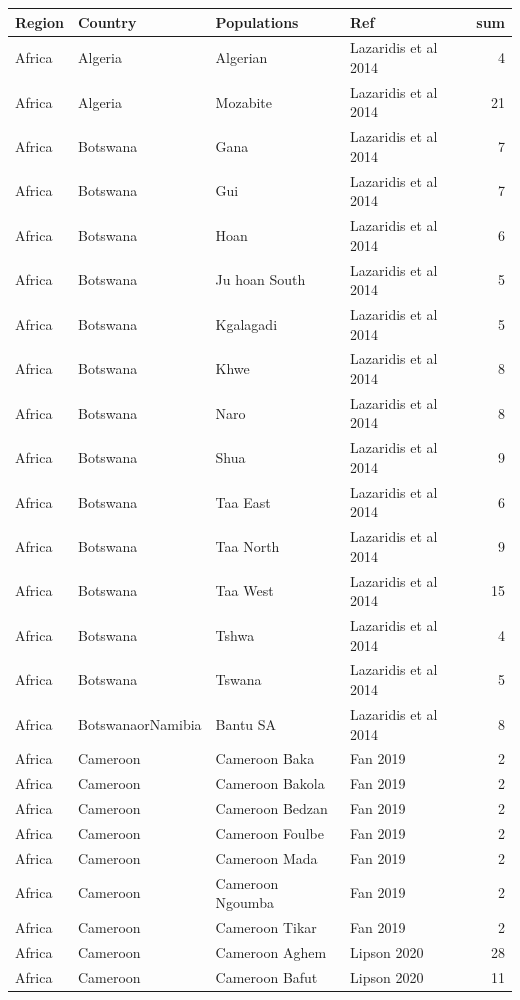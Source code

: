 \begin{longtable}[t]{lll>{\raggedright\arraybackslash}p{9em}r}
\toprule
Region & Country & Populations & Ref & sum\\
\midrule
Africa & Algeria & Algerian & Lazaridis et al 2014 & 4\\
Africa & Algeria & Mozabite & Lazaridis et al 2014 & 21\\
Africa & Botswana & Gana & Lazaridis et al 2014 & 7\\
Africa & Botswana & Gui & Lazaridis et al 2014 & 7\\
Africa & Botswana & Hoan & Lazaridis et al 2014 & 6\\
\addlinespace
Africa & Botswana & Ju hoan South & Lazaridis et al 2014 & 5\\
Africa & Botswana & Kgalagadi & Lazaridis et al 2014 & 5\\
Africa & Botswana & Khwe & Lazaridis et al 2014 & 8\\
Africa & Botswana & Naro & Lazaridis et al 2014 & 8\\
Africa & Botswana & Shua & Lazaridis et al 2014 & 9\\
\addlinespace
Africa & Botswana & Taa East & Lazaridis et al 2014 & 6\\
Africa & Botswana & Taa North & Lazaridis et al 2014 & 9\\
Africa & Botswana & Taa West & Lazaridis et al 2014 & 15\\
Africa & Botswana & Tshwa & Lazaridis et al 2014 & 4\\
Africa & Botswana & Tswana & Lazaridis et al 2014 & 5\\
\addlinespace
Africa & BotswanaorNamibia & Bantu SA & Lazaridis et al 2014 & 8\\
Africa & Cameroon & Cameroon Baka & Fan 2019 & 2\\
Africa & Cameroon & Cameroon Bakola & Fan 2019 & 2\\
Africa & Cameroon & Cameroon Bedzan & Fan 2019 & 2\\
Africa & Cameroon & Cameroon Foulbe & Fan 2019 & 2\\
\addlinespace
Africa & Cameroon & Cameroon Mada & Fan 2019 & 2\\
Africa & Cameroon & Cameroon Ngoumba & Fan 2019 & 2\\
Africa & Cameroon & Cameroon Tikar & Fan 2019 & 2\\
Africa & Cameroon & Cameroon Aghem & Lipson 2020 & 28\\
Africa & Cameroon & Cameroon Bafut & Lipson 2020 & 11\\

\end{longtable}
